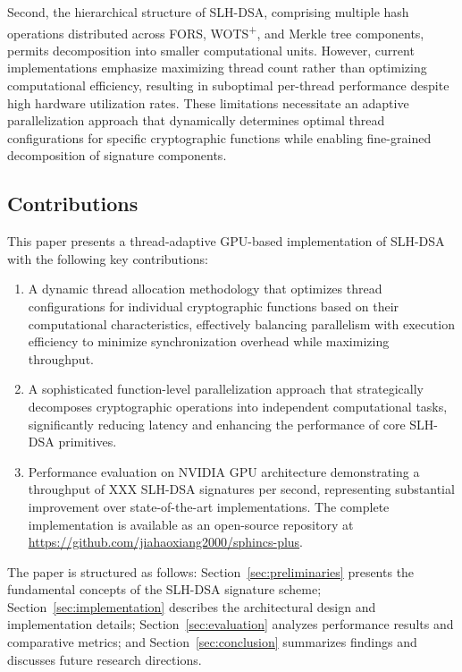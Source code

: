 \documentclass[journal]{IEEEtran}
\begin{document}
Second, the hierarchical structure of SLH-DSA, comprising multiple hash operations distributed across FORS, WOTS\textsuperscript{+}, and Merkle tree components, permits decomposition into smaller computational units. However, current implementations emphasize maximizing thread count rather than optimizing computational efficiency, resulting in suboptimal per-thread performance despite high hardware utilization rates.
These limitations necessitate an adaptive parallelization approach that dynamically determines optimal thread configurations for specific cryptographic functions while enabling fine-grained decomposition of signature components.

\subsection{Contributions}

This paper presents a thread-adaptive GPU-based implementation of SLH-DSA with the following key contributions:

\begin{enumerate}
  \item A dynamic thread allocation methodology that optimizes thread configurations for individual cryptographic functions based on their computational characteristics, effectively balancing parallelism with execution efficiency to minimize synchronization overhead while maximizing throughput.

  \item A sophisticated function-level parallelization approach that strategically decomposes cryptographic operations into independent computational tasks, significantly reducing latency and enhancing the performance of core SLH-DSA primitives.

  \item Performance evaluation on NVIDIA GPU architecture demonstrating a throughput of XXX SLH-DSA signatures per second, representing substantial improvement over state-of-the-art implementations.
  The complete implementation is available as an open-source repository at \url{https://github.com/jiahaoxiang2000/sphincs-plus}.
\end{enumerate}

The paper is structured as follows: Section~\ref{sec:preliminaries} presents the fundamental concepts of the SLH-DSA signature scheme; Section~\ref{sec:implementation} describes the architectural design and implementation details; Section~\ref{sec:evaluation} analyzes performance results and comparative metrics; and Section~\ref{sec:conclusion} summarizes findings and discusses future research directions.
\end{document}
